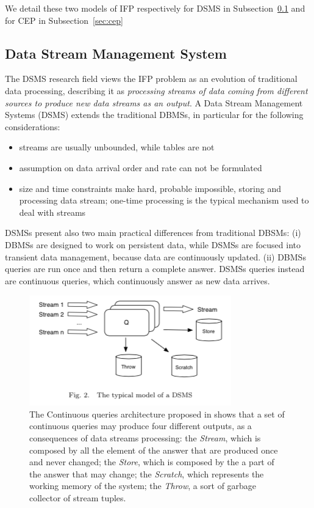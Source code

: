 We detail these two models of IFP respectively for DSMS in Subsection~\ref{sec:dsms} and for CEP in Subsection~\ref{sec:cep}

\subsection{Data Stream Management System}\label{sec:dsms}
The DSMS research field views the IFP problem as an evolution of traditional data processing, describing it as \textit{processing streams of data coming from different sources to produce new data streams as an output}. A Data Stream Management Systems (DSMS) extends the traditional DBMSs, in particular for the following considerations:

\begin{itemize}
\item streams are usually unbounded, while tables are not
\item assumption on data arrival order and rate can not be formulated
\item size and time constraints make hard, probable impossible, storing and processing data stream; one-time processing is the typical mechanism used to deal with streams
\end{itemize} 

DSMSs present also two main practical differences from traditional DBSMs: (i) DBMSs are designed to work on persistent data, while DSMSs are focused into transient data management, because data are continuously updated. (ii) DBMSs queries are run once and then return a complete answer. DSMSs queries instead are continuous queries, which continuously answer as new data arrives. 

\begin{figure}[tbh]
  \centering
	\includegraphics[width=0.75\linewidth]{images/dsms}
	\caption[General Continuous Queries Architecture]{The Continuous queries architecture proposed in \cite{Babu:2001:CQO:603867.603884} shows that  a set of continuous queries may produce four different outputs, as a consequences of data streams processing: the \textit{Stream}, which is composed by all the element of the answer that are produced once and never changed; the \textit{Store}, which is composed by the a part of the answer that may change; the \textit{Scratch}, which represents the working memory of the system; the \textit{Throw}, a sort of garbage collector of stream tuples.} 
  	\label{fig:dsms}
\end{figure}

